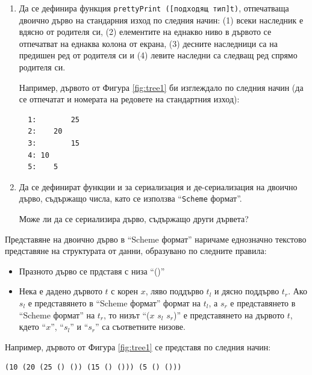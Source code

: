 \begin{enumerate}[resume]

  \item Да се дефинира функция \texttt{prettyPrint ([подходящ тип]t)}, отпечатваща двоично дърво на стандарния изход по следния начин: (1) всеки наследник е вдясно от родителя си, (2) елементите на еднакво ниво в дървото се отпечатват на еднаква колона от екрана, (3) десните наследници са на предишен ред от родителя си и (4) левите наследни са следващ ред спрямо родителя си.

  Например, дървото от Фигура \ref{fig:tree1} би изглеждало по следния начин (да се отпечатат и номерата на редовете на стандартния изход):

  \begin{verbatim}
  1:        25
  2:    20
  3:        15
  4: 10
  5:    5
  \end{verbatim}



  \item Да се дефинират функции  и  за сериализация и де-сериализация на двоично дърво, съдържащо числа, като се използва ``\texttt{Scheme} формат''.
  
   Може ли да се сериализира дърво, съдържащо други дървета?
\end{enumerate}

\begin{mdframed}[hidealllines=true,backgroundcolor=gray!20]
Представяне на двоично дърво в ``Scheme формат'' наричаме еднозначно текстово представяне на структурата от данни, образувано по следните правила:
\begin{itemize}
  \item Празното дърво се прдставя с низа ``()''
  \item Нека е дадено дървото $t$ с корен $x$, ляво поддърво $t_l$ и дясно поддърво $t_r$. Ако $s_l$ е представянето в ``Scheme формат'' формат на $t_l$, а $s_r$ е представянето в ``Scheme формат'' на $t_r$, то низът ``($x$ $s_l$ $s_r$)'' е представянето на дървото $t$, кдето ``$x$'', ``$s_l$'' и ``$s_r$'' са съответните низове.

\end{itemize}
Например, дървото от Фигура \ref{fig:tree1} се представя по следния начин:

\begin{verbatim}
(10 (20 (25 () ()) (15 () ())) (5 () ()))
\end{verbatim}

\end{mdframed}

